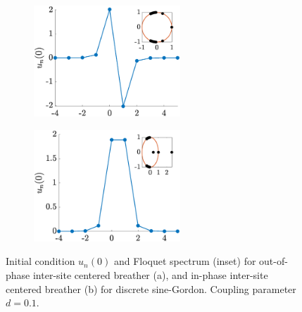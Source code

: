 \documentclass[12pt,reqno]{amsart}
\theoremstyle{definition}
\begin{document}
\begin{figure}
	\begin{center}
	\begin{subfigure}{0.3\linewidth}
		\caption{}
		\includegraphics[width=5.5cm]{SGintersitepm.eps} \hspace{-0.5cm}
		\label{fig:SGintersitea} 
	\end{subfigure}
	\begin{subfigure}{0.3\linewidth}
		\caption{}
		\includegraphics[width=5.5cm]{SGintersitepp.eps} \hspace{-0.5cm}
		\label{fig:SGintersiteb} 
	\end{subfigure}
	\end{center}
	\caption{Initial condition $u_n(0)$ and Floquet spectrum (inset) for out-of-phase inter-site centered breather (a), and in-phase inter-site centered breather (b) for discrete sine-Gordon. Coupling parameter $d=0.1$.}
	\label{fig:SGintersite}
\end{figure}
\end{document}
